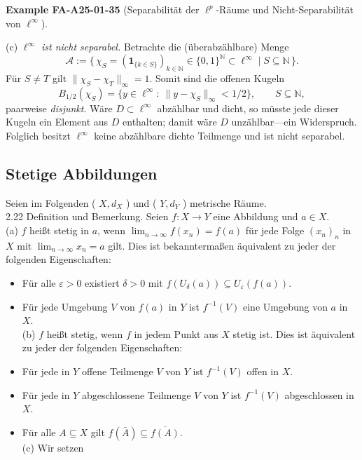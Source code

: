 \documentclass[10pt, letterpaper]{article}
\newcommand{\CustomHeading}[3]{%
  \par\medskip\noindent%
  \textbf{#1 #2} \textnormal{(#3)}.\enskip%
}
\newenvironment{EXA}[2]{\begin{unitbox}\CustomHeading{Example}{#1}{#2}}{\end{unitbox}}
\begin{document}
\begin{EXA}{FA-A25-01-35}{Separabilität der $\ell^{p}$-Räume und Nicht-Separabilität von $\ell^{\infty}$}
\smallskip
(c) \emph{$\ell^{\infty}$ ist nicht separabel.}
Betrachte die (überabzählbare) Menge
\[
\mathcal{A}:=\{\,\chi_{S}=(\mathbf{1}_{\{k\in S\}})_{k\in\mathbb{N}} \in \{0,1\}^{\mathbb{N}} \subset \ell^{\infty}\mid S\subseteq \mathbb{N}\,\}.
\]
Für $S\neq T$ gilt $\|\chi_{S}-\chi_{T}\|_{\infty}=1$. Somit sind die offenen Kugeln
\[
B_{1/2}(\chi_{S})=\{y\in\ell^{\infty}:\ \|y-\chi_{S}\|_{\infty}<1/2\},\qquad S\subseteq\mathbb{N},
\]
paarweise \emph{disjunkt}. Wäre $D\subset\ell^{\infty}$ abzählbar und dicht, so müsste jede dieser Kugeln ein Element aus $D$ enthalten; damit wäre $D$ unzählbar—ein Widerspruch. Folglich besitzt $\ell^{\infty}$ keine abzählbare dichte Teilmenge und ist nicht separabel.
\end{EXA}





\pagebreak


\subsection*{Stetige Abbildungen}


Seien im Folgenden ( $X, d_{X}$ ) und ( $Y, d_{Y}$ ) metrische Räume.\\
2.22 Definition und Bemerkung. Seien $f: X \rightarrow Y$ eine Abbildung und $a \in X$.\\
(a) $f$ heißt stetig in $a$, wenn $\lim _{n \rightarrow \infty} f\left(x_{n}\right)=f(a)$ für jede Folge $\left(x_{n}\right)_{n}$ in $X$ mit $\lim _{n \rightarrow \infty} x_{n}=a$ gilt. Dies ist bekanntermaßen äquivalent zu jeder der folgenden Eigenschaften:

\begin{itemize}
  \item Für alle $\varepsilon>0$ existiert $\delta>0$ mit $f\left(U_{\delta}(a)\right) \subseteq U_{\varepsilon}(f(a))$.
  \item Für jede Umgebung $V$ von $f(a)$ in $Y$ ist $f^{-1}(V)$ eine Umgebung von $a$ in $X$.\\
(b) $f$ heißt stetig, wenn $f$ in jedem Punkt aus $X$ stetig ist. Dies ist äquivalent zu jeder der folgenden Eigenschaften:
  \item Für jede in $Y$ offene Teilmenge $V$ von $Y$ ist $f^{-1}(V)$ offen in $X$.
  \item Für jede in $Y$ abgeschlossene Teilmenge $V$ von $Y$ ist $f^{-1}(V)$ abgeschlossen in $X$.
  \item Für alle $A \subseteq X$ gilt $f(\bar{A}) \subseteq \overline{f(A)}$.\\
(c) Wir setzen
\end{itemize}
\end{document}
